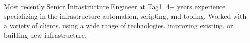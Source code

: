 

\begin{cvparagraph}

Most recently Senior Infrastructure Engineer at Tag1. 4+ years experience
	specializing in the infrastructure automation, scripting, and tooling.
	Worked with a variety of clients, using a wide range of technologies,
	improving existing, or building new infrastructure.
\end{cvparagraph}
